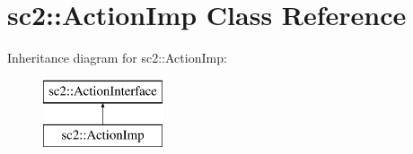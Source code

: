 \hypertarget{classsc2_1_1_action_imp}{}\section{sc2\+:\+:Action\+Imp Class Reference}
\label{classsc2_1_1_action_imp}
Inheritance diagram for sc2\+:\+:Action\+Imp\+:\begin{figure}[H]
\begin{center}
\leavevmode
\includegraphics[height=2.000000cm]{classsc2_1_1_action_imp}
\end{center}
\end{figure}
